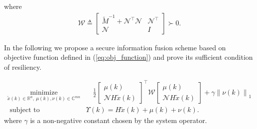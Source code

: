 \documentclass[journal]{IEEEtran}
\newcommand{\Rb}{{\mathbb{R}}}
\newcommand{\Cb}{{\mathbb{C}}}
\newcommand{\Sc}{{\mathcal{S}}}
\newcommand{\Nc}{{\mathcal{N}}}
\newcommand{\Wc}{{\mathcal{W}}}
\newcommand{\rs}{\text{rowspan}}
\begin{document}
	where 
	\begin{align}\label{eq:def_W}
		\Wc\triangleq \begin{bmatrix}
			\tilde{M}^{-1}+ \Nc^{\top}\Nc & \Nc^{\top} \\
			\Nc &  I
		\end{bmatrix}\succ 0.
	\end{align}
	
	
	
	In the following we propose a secure information fusion scheme based on objective function defined in (\ref{eq:obj_function}) and prove its sufficient condition of resiliency.
	
	\begin{subequations}\label{pb:resilient_LASSO}
		\begin{align}
			\underset{{\tilde{x}}(k)\in \Rb^n,\ \mu(k),\nu(k)\in\Cb^{mn}}{\text{minimize}}&\quad \frac{1}{2} 
			\begin{bmatrix}
				\mu(k) \\
				\Nc H \tilde{x}(k)
			\end{bmatrix}^\top \Wc
			\begin{bmatrix}
				\mu(k) \\
				\Nc H \tilde{x}(k)
			\end{bmatrix} + \gamma\left\|\nu(k)\right\|_1  \\
			\text { subject to }\quad&
			\Upsilon (k)= H \tilde{x}(k)+\mu(k)+\nu(k) .  
		\end{align}
	\end{subequations}
	where $\gamma$ is a non-negative constant chosen by the system operator.
	
\end{document}
